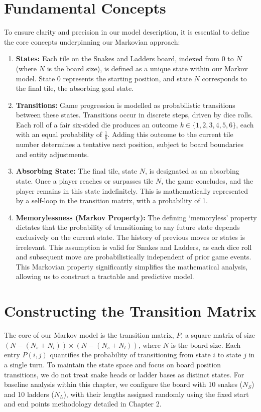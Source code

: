\section{Fundamental Concepts}
To ensure clarity and precision in our model description, it is essential to define the core concepts underpinning our Markovian approach:
\begin{enumerate}
	\item \textbf{States:} Each tile on the Snakes and Ladders board, indexed from 0 to $N$ (where $N$ is the board size), is defined as a unique state within our Markov model. State 0 represents the starting position, and state $N$ corresponds to the final tile, the absorbing goal state.
	\item \textbf{Transitions:} Game progression is modelled as probabilistic transitions between these states. Transitions occur in discrete steps, driven by dice rolls. Each roll of a fair six-sided die produces an outcome $k \in \{1, 2, 3, 4, 5, 6\}$, each with an equal probability of $\frac{1}{6}$. Adding this outcome to the current tile number determines a tentative next position, subject to board boundaries and entity adjustments.
	\item \textbf{Absorbing State:} The final tile, state $N$, is designated as an absorbing state. Once a player reaches or surpasses tile $N$, the game concludes, and the player remains in this state indefinitely. This is mathematically represented by a self-loop in the transition matrix, with a probability of 1.
	\item \textbf{Memorylessness (Markov Property):} The defining ‘memoryless’ property dictates that the probability of transitioning to any future state depends exclusively on the current state. The history of previous moves or states is irrelevant. This assumption is valid for Snakes and Ladders, as each dice roll and subsequent move are probabilistically independent of prior game events. This Markovian property significantly simplifies the mathematical analysis, allowing us to construct a tractable and predictive model.
\end{enumerate}

\section{Constructing the Transition Matrix}
The core of our Markov model is the transition matrix, $P$, a square matrix of size $(N-(N_s + N_l)) \times (N-(N_s + N_l))$, where $N$ is the board size. Each entry $P(i,j)$ quantifies the probability of transitioning from state $i$ to state $j$ in a single turn. To maintain the state space and focus on board position transitions, we do not treat snake heads or ladder bases as distinct states. For baseline analysis within this chapter, we configure the board with 10 snakes ($N_S$) and 10 ladders ($N_L$), with their lengths assigned randomly using the fixed start and end points methodology detailed in Chapter 2.

